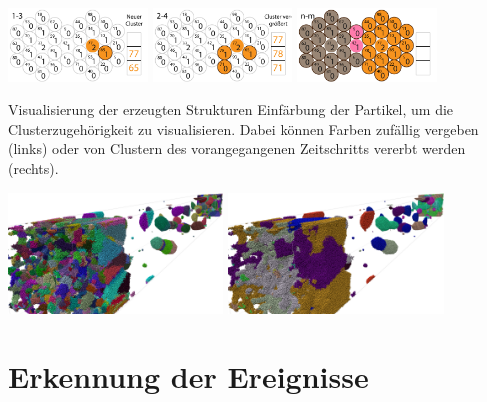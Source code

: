 \documentclass[10pt]{beamer}
\begin{document}
\begin{frame}
	\includegraphics*[width=3.7cm]{media/cluster/cfd003.png} \includegraphics*[width=3.7cm]{media/cluster/cfd007.png}	\includegraphics*[width=3.7cm]{media/cluster/cfd011.png}
\end{frame}

\begin{frame}{Visualisierung der erzeugten Strukturen}
	Einfärbung der Partikel, um die Clusterzugehörigkeit zu visualisieren. Dabei können Farben zufällig vergeben (links) oder von Clustern des vorangegangenen Zeitschritts vererbt werden (rechts).
	
	\includegraphics*[width=5.7cm]{media/eva/clusterfarbe-allRd-small.png}
	\includegraphics*[width=5.7cm]{media/eva/clusterfarbe-rdInteritance-small.png}
\end{frame}

\section{Erkennung der Ereignisse}
\end{document}
